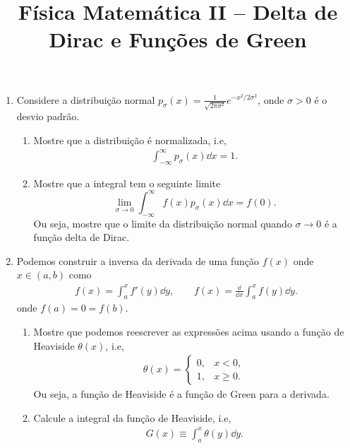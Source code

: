 \newif\ifuseseminar
\useseminartrue


\title{Física Matemática II -- Delta de Dirac e Funções de Green}


\begin{enumerate}
	\item Considere a distribuição normal
	      $p_\sigma(x)=\frac{1}{\sqrt{2\pi\sigma^2}}e^{-x^2/2\sigma^2}$, onde $\sigma>0$
	      é o desvio padrão.
	      \begin{enumerate}
		      \item Mostre que a distribuição é normalizada, i.e,
		            \begin{align}
			            \int_{-\infty}^{\infty}p_\sigma(x)\dd x = 1.
		            \end{align}
		      \item Mostre que a integral tem o seguinte limite
		            $$\lim_{\sigma\to0}\int_{-\infty}^{\infty}f(x)p_\sigma(x)\dd x =
			            f(0).$$
		            Ou seja, mostre que o limite da distribuição normal quando
		            $\sigma\rightarrow 0$ é a função delta de Dirac.
	      \end{enumerate}
	\item Podemos construir a inversa da derivada de uma função $f(x)$ onde $x\in(a, b)$
	      como
	      \begin{align}
		      f(x) = \int_{a}^{x}f'(y)\dd y,\qquad f(x) = \frac{\dd}{\dd x}\int_{a}^{x}f(y)\dd y.
	      \end{align}
	      onde $f(a) = 0 = f(b)$.
	      \begin{enumerate}
		      \item Mostre que podemos reescrever as expressões acima usando a
		            função de Heaviside $\theta(x)$, i.e,
		            \begin{align}
			            \theta(x) = \begin{cases}
				                        0, & x<0,     \\
				                        1, & x\geq 0.
			                        \end{cases}
		            \end{align}
		            Ou seja, a função de Heaviside é a função de Green para a derivada.
		      \item Calcule a integral da função de Heaviside, i.e,
		            \begin{align}
			            G(x) \equiv \int_{a}^{x}\theta(y)\dd y.
		            \end{align}

\end{enumerate}
\end{enumerate}
